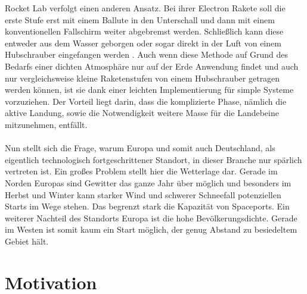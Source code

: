 Rocket Lab verfolgt einen anderen Ansatz. Bei ihrer Electron Rakete soll die erste Stufe erst mit einem Ballute in den Unterschall und dann mit einem konventionellen Fallschirm weiter abgebremst werden. Schließlich kann diese entweder aus dem Wasser geborgen oder sogar direkt in der Luft von einem Hubschrauber eingefangen werden \cite{electronRocketLab}. Auch wenn diese Methode auf Grund des Bedarfs einer dichten Atmosphäre nur auf der Erde Anwendung findet und auch nur vergleichsweise kleine Raketenstufen von einem Hubschrauber getragen werden können, ist sie dank einer leichten Implementierung für simple Systeme vorzuziehen. Der Vorteil liegt darin, dass die komplizierte Phase, nämlich die aktive Landung, sowie die Notwendigkeit weitere Masse für die Landebeine mitzunehmen, entfällt.
\\~\\
Nun stellt sich die Frage, warum Europa und somit auch Deutschland, als eigentlich technologisch fortgeschrittener Standort, in dieser Branche nur spärlich vertreten ist. Ein großes Problem stellt hier die Wetterlage dar. Gerade im Norden Europas sind Gewitter das ganze Jahr über möglich und besonders im Herbst und Winter kann starker Wind und schwerer Schneefall potenziellen Starts im Wege stehen. Das begrenzt stark die Kapazität von Spaceports. Ein weiterer Nachteil des Standorts Europa ist die hohe Bevölkerungsdichte. Gerade im Westen ist somit kaum ein Start möglich, der genug Abstand zu besiedeltem Gebiet hält.

\section{Motivation}

